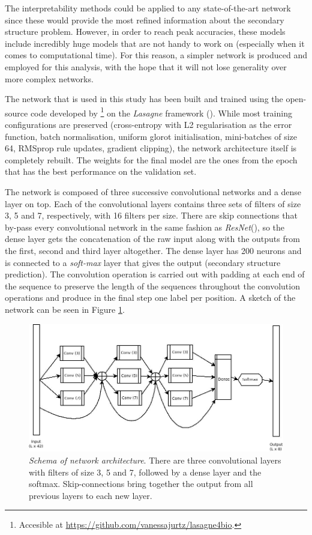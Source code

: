 The interpretability methods could be applied to any state-of-the-art network since these would provide the most refined information about the secondary structure problem. However, in order to reach peak accuracies, these models include incredibly huge models that are not handy to work on (especially when it comes to computational time). For this reason, a simpler network is produced and employed for this analysis, with the hope that it will not lose generality over more complex networks.

The network that is used in this study has been built and trained using the open-source code developed by \cite{Jurtz2017}\footnote{Accesible at \url{https://github.com/vanessajurtz/lasagne4bio}.} on the \textit{Lasagne} framework (\cite{Dieleman2015}). While most training configurations are preserved (cross-entropy with L2 regularisation as the error function, batch normalisation, uniform glorot initialisation, mini-batches of size 64, RMSprop rule updates, gradient clipping), the network architecture itself is completely rebuilt. The weights for the final model are the ones from the epoch that has the best performance on the validation set.

The network is composed of three successive convolutional networks and a dense layer on top. Each of the convolutional layers contains three sets of filters of size 3, 5 and 7, respectively, with 16 filters per size. There are skip connections that by-pass every convolutional network in the same fashion as \textit{ResNet}(\cite{He2015}), so the dense layer gets the concatenation of the raw input along with the outputs from the first, second and third layer altogether.
The dense layer has 200 neurons and is connected to a \textit{soft-max} layer that gives the output (secondary structure prediction). The convolution operation is carried out with padding at each end of the sequence to preserve the length of the sequences throughout the convolution operations and produce in the final step one label per position. A sketch of the network can be seen in Figure \ref{fig:pureConv}.

\begin{figure}
\centering
\includegraphics[width=0.8\linewidth]{Figures/pureConv}
\caption{\textit{Schema of network architecture}. There are three convolutional layers with filters of size 3, 5 and 7, followed by a dense layer and the softmax. Skip-connections bring together the output from all previous layers to each new layer.}
\label{fig:pureConv}
\end{figure}


